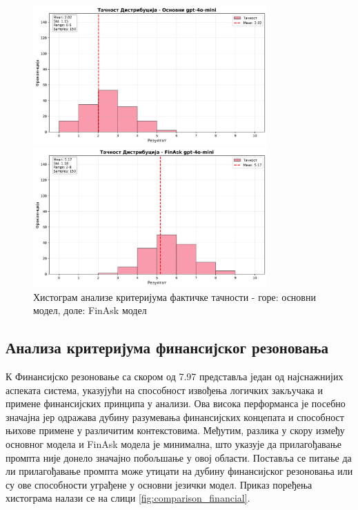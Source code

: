 \begin{figure}[h]
    \centering
    \includegraphics[width=0.8\textwidth]{images/osnovni/criteria_analysis_factual_correctness_histogram.png}
    
    \vspace{0.5cm}
    
    \includegraphics[width=0.8\textwidth]{images/FinAsk/criteria_analysis_factual_correctness_histogram.png}
    \caption{Хистограм анализе критеријума фактичке тачности - горе: основни модел, доле: FinAsk модел}
    \label{fig:comparison_factual}
\end{figure}

\subsection{Анализа критеријума финансијског резоновања}

К Финансијско резоновање са скором од 7.97 представља један од најснажнијих аспеката система, указујући на способност извођења логичких закључака и примене финансијских принципа у анализи. Ова висока перформанса је посебно значајна јер одражава дубину разумевања финансијских концепата и способност њихове примене у различитим контекстовима. Међутим, разлика у скору између основног модела и FinAsk модела је минимална, што указује да прилагођавање промпта није донело значајно побољшање у овој области. Поставља се питање да ли прилагођавање промпта може утицати на дубину финансијског резоновања или су ове способности уграђене у основни језички модел. Приказ поређења хистограма налази се на слици \ref{fig:comparison_financial}.

